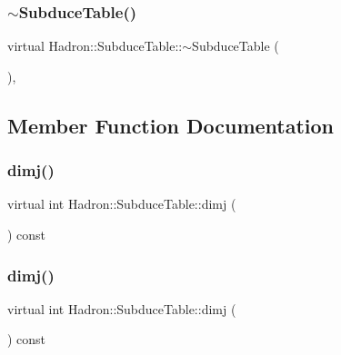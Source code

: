 \subsubsection{\texorpdfstring{$\sim$SubduceTable()}{~SubduceTable()}\hspace{0.1cm}{\footnotesize\ttfamily [3/3]}}
{\footnotesize\ttfamily virtual Hadron\+::\+Subduce\+Table\+::$\sim$\+Subduce\+Table (\begin{DoxyParamCaption}{ }\end{DoxyParamCaption})\hspace{0.3cm}{\ttfamily [inline]}, {\ttfamily [virtual]}}



\subsection{Member Function Documentation}
\mbox{\label{classHadron_1_1SubduceTable_a04d125e8e09b85787472c3dbb4c93059}} 
\subsubsection{\texorpdfstring{dimj()}{dimj()}\hspace{0.1cm}{\footnotesize\ttfamily [1/3]}}
{\footnotesize\ttfamily virtual int Hadron\+::\+Subduce\+Table\+::dimj (\begin{DoxyParamCaption}{ }\end{DoxyParamCaption}) const\hspace{0.3cm}{\ttfamily [pure virtual]}}

\mbox{\label{classHadron_1_1SubduceTable_a04d125e8e09b85787472c3dbb4c93059}} 
\subsubsection{\texorpdfstring{dimj()}{dimj()}\hspace{0.1cm}{\footnotesize\ttfamily [2/3]}}
{\footnotesize\ttfamily virtual int Hadron\+::\+Subduce\+Table\+::dimj (\begin{DoxyParamCaption}{ }\end{DoxyParamCaption}) const\hspace{0.3cm}{\ttfamily [pure virtual]}}

